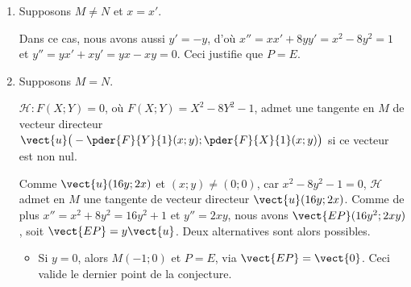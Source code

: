 \begin{enumerate}
	\noindent
	$\phantom{\det\left ( \vect{EP} ; \vect{MN} \right)}
	=
	(x x' + 8 y y' - 1)(y' - y) -  (y x' + x y') (x' - x)$
	
	\noindent
	$\phantom{\det\left ( \vect{EP} ; \vect{MN} \right)}
	=
	x x' y' + 8 y y'^2 - y' - x x' y - 8 y^2 y' + y
	- 
	y x'^2 - x x' y' + y x x' + x^2 y'$
	
	\noindent
	$\phantom{\det\left ( \vect{EP} ; \vect{MN} \right)}
	=
	8 y y'^2 - y' - 8 y^2 y' + y
	- 
	y x'^2 + x^2 y'$
	
	\smallskip
	
	\noindent
	Réordonnons les termes en nous souvenant que $x^2 - 8 y^2 = 1$ et $x'^2 - 8 y'^2 = 1$.

	\smallskip
	
	\noindent
	${\det\left ( \vect{EP} ; \vect{MN} \right)}
	=
	x^2 y' - 8 y^2 y'
	- y x'^2 + 8 y y'^2
	- y' + y$
	
	\noindent
	$\phantom{\det\left ( \vect{EP} ; \vect{MN} \right)}
	=
	(x^2 - 8 y^2)y'
	- y(x'^2 - 8 y'^2)
	- y' + y$
	
	\noindent
	$\phantom{\det\left ( \vect{EP} ; \vect{MN} \right)}
	=
	y'
	- y
	- y' + y$
	
	\noindent
	$\phantom{\det\left ( \vect{EP} ; \vect{MN} \right)}
	=
	0$
	
	\smallskip
	
	\noindent
	Les vecteurs $\vect{EP}$ et $\vect{MN}$ sont bien colinéaires.


	\medskip
	\item Supposons $M \neq N$ et $x = x'$.
	
	\smallskip
	
	\noindent
	Dans ce cas, 
	nous avons aussi $y' = - y$, 
	d'où
	$x'' = x x' + 8 y y' = x^2 - 8 y^2 = 1$
	et
	$y'' = y x' + x y' = y x - x y = 0$.
	Ceci justifie que $P = E$.


	\medskip
	\item Supposons $M = N$.
	
	\smallskip
	
	\noindent
	$\mathcal{H}: F(X ; Y) = 0$, où $F(X ; Y) = X^2 - 8 Y^2 - 1$,
	admet une tangente en $M$ de vecteur directeur
	$\vect{u} \big( - \pder{F}{Y}{1}(x ; y) ; \pder{F}{X}{1}(x ; y) \big)$ si ce vecteur est non nul.
	
	\noindent
	Comme $\vect{u} ( 16y ; 2x )$ et $(x ; y) \neq (0 ; 0)$, car $x^2 - 8 y^2 - 1 = 0$,
	$\mathcal{H}$ admet en $M$ une tangente de vecteur directeur $\vect{u} ( 16y ; 2x )$.
	Comme de plus $x'' = x^2 + 8y^2 = 16y^2 + 1$ et $y'' = 2xy$, nous avons
	$\vect{EP} ( 16y^2 ; 2xy )$,
	soit $\vect{EP} = y \vect{u}$.
	Deux alternatives sont alors possibles.
	\begin{itemize}
	    \item Si $y = 0$, alors $M(-1 ; 0)$ et $P = E$, via $\vect{EP} = \vect{0}$. Ceci valide le dernier point de la conjecture.


\end{itemize}
\end{enumerate}
